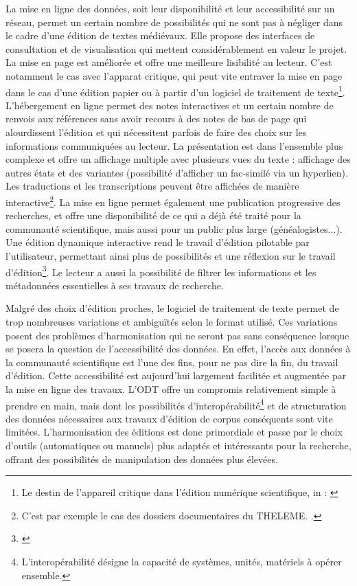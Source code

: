 \par La mise en ligne des données, soit leur disponibilité et leur accessibilité sur un réseau, permet un certain nombre de possibilités qui ne sont pas à négliger dans le cadre d'une édition de textes médiévaux. Elle propose des interfaces de consultation et de visualisation qui mettent considérablement en valeur le projet. La mise en page est améliorée et offre une meilleure lisibilité au lecteur. C'est notamment le cas avec l'apparat critique, qui peut vite entraver la mise en page dans le cas d'une édition papier ou à partir d'un logiciel de traitement de texte\footnote{\og Le destin de l'appareil critique dans l'édition numérique scientifique\fg, in : \cite{apollonEditionCritiqueEre2017}}. L'hébergement en ligne permet des notes interactives et un certain nombre de renvois aux références sans avoir recours à des notes de bas de page qui alourdissent l'édition et qui nécessitent parfois de faire des choix sur les informations communiquées au lecteur. La présentation est dans l'ensemble plus complexe et offre un affichage multiple avec plusieurs vues du texte : affichage des autres états et des variantes (possibilité d'afficher un fac-similé via un hyperlien). Les traductions et les transcriptions peuvent être affichées de manière interactive\footnote{C'est par exemple le cas des dossiers documentaires du THELEME. \cite{TechniquesPourHistorien}.}. La mise en ligne permet également une publication progressive des recherches, et offre une disponibilité de ce qui a déjà été traité pour la communauté scientifique, mais aussi pour un public plus large (généalogistes...). Une édition dynamique interactive rend le travail d'édition pilotable par l'utilisateur, permettant ainsi plus de possibilités et une réflexion sur le travail d'édition\footnote{\cite{apollonEditionCritiqueEre2017}}. Le lecteur a aussi la possibilité de filtrer les informations et les métadonnées essentielles à ses travaux de recherche. 
\newline 

\par Malgré des choix d'édition proches, le logiciel de traitement de texte permet de trop nombreuses variations et ambiguïtés selon le format utilisé. Ces variations posent des problèmes d'harmonisation qui ne seront pas sans conséquence lorsque se posera la question de l'accessibilité des données. En effet, l'accès aux données à la communauté scientifique est l'une des fins, pour ne pas dire la fin, du travail d'édition. Cette accessibilité est aujourd'hui largement facilitée et augmentée par la mise en ligne des travaux. L'ODT offre un compromis relativement simple à prendre en main, mais dont les possibilités d'interopérabilité\footnote{L'interopérabilité désigne la capacité de systèmes, unités, matériels à opérer ensemble.} et de structuration des données nécessaires aux travaux d'édition de corpus conséquents sont vite limitées. L'harmonisation des éditions est donc primordiale et passe par le choix d'outils (automatiques ou manuels) plus adaptés et intéressants pour la recherche, offrant des possibilités de manipulation des données plus élevées.

\newpage
\thispagestyle{empty}
\mbox{}
\newpage

